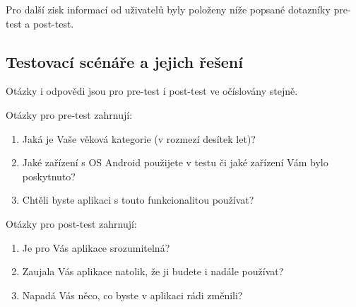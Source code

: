 \documentclass[thesis=B,czech]{FITthesis}[2013/10/20]
\begin{document}
Pro další zisk informací od uživatelů byly položeny níže popsané dotazníky pre-test a post-test.

\subsection{Testovací scénáře a jejich řešení}

Otázky i odpovědi jsou pro pre-test i post-test ve očíslovány stejně.

Otázky pro pre-test zahrnují:
\begin{enumerate}
  \item Jaká je Vaše věková kategorie (v rozmezí desítek let)?
  \item Jaké zařízení s OS Android použijete v testu či jaké zařízení Vám bylo poskytnuto?
  \item Chtěli byste aplikaci s touto funkcionalitou používat?
\end{enumerate}

Otázky pro post-test zahrnují:
\begin{enumerate}
  \item Je pro Vás aplikace srozumitelná?
  \item Zaujala Vás aplikace natolik, že ji budete i nadále používat?
  \item Napadá Vás něco, co byste v aplikaci rádi změnili?
\end{enumerate}
\end{document}
